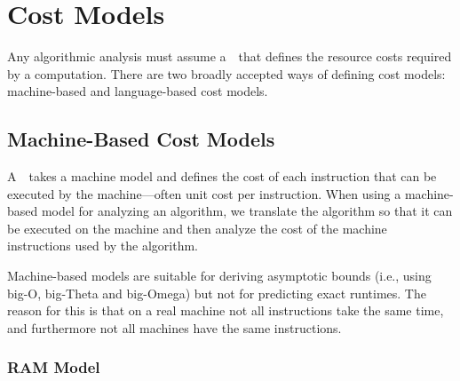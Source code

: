 \chapter{Cost Models}
\label{ch:analysis::models}


\begin{preamble}
Any algorithmic analysis must assume a~~that defines
the resource costs required by a computation.
%
There are two broadly accepted ways of defining cost models:
machine-based and language-based cost models.
%
\end{preamble}

\section{Machine-Based Cost Models}

\begin{definition}
A~~takes a machine model and defines the
cost of each instruction that can be executed by the machine---often
unit cost per instruction.
%
When using a machine-based model for analyzing an algorithm, we
translate the algorithm so that it can be executed on the machine and
then analyze the cost of the machine instructions used by the algorithm.
%
%
\end{definition}

\begin{remark}
Machine-based models are suitable for deriving asymptotic bounds
(i.e., using big-O, big-Theta and big-Omega) but not for predicting
exact runtimes.   The reason for this is that on a real machine not all
instructions take the same time, and furthermore not all machines have
the same instructions.
\end{remark}

\subsection{RAM Model}


